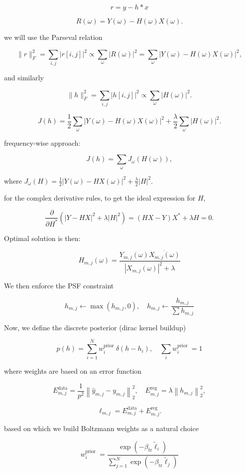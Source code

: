 \documentclass{article}
\theoremstyle{definition}
\begin{document}
$$
r=y-h * x
$$

$$
R(\omega)=Y(\omega)-H(\omega) X(\omega) .
$$

we will use the Parseval relation

$$
\|r\|_F^2=\sum_{i, j}|r[i, j]|^2 \propto \sum_\omega|R(\omega)|^2=\sum_\omega|Y(\omega)-H(\omega) X(\omega)|^2,
$$

and similarly 

$$
\|h\|_F^2=\sum_{i, j}|h[i, j]|^2 \propto \sum_\omega|H(\omega)|^2 .
$$


$$
J(h)=\frac{1}{2} \sum_\omega|Y(\omega)-H(\omega) X(\omega)|^2+\frac{\lambda}{2} \sum_\omega|H(\omega)|^2 .
$$


frequency-wise approach:

$$
J(h)=\sum_\omega J_\omega(H(\omega)),
$$

where $J_\omega(H)=\frac{1}{2}|Y(\omega)-H X(\omega)|^2+\frac{\lambda}{2}|H|^2$.


for the complex derivative rules, to get the ideal expression for $H$,



$$
\frac{\partial}{\partial H^*}\left(|Y-H X|^2+\lambda|H|^2\right)=(H X-Y) X^*+\lambda H=0 .
$$


Optimal solution is then:

$$
H_{m, j}(\omega)=\frac{Y_{m, j}(\omega) \overline{X_{m, j}(\omega)}}{\left|X_{m, j}(\omega)\right|^2+\lambda}
$$

We then enforce the PSF constraint 


$$
h_{m, j} \leftarrow \max \left(h_{m, j}, 0\right), \quad h_{m, j} \leftarrow \frac{h_{m, j}}{\sum h_{m, j}}
$$


Now, we define the discrete posterior (dirac kernel buildup) 


$$
p(h)=\sum_{i=1}^N w_i^{\text {prior }} \delta\left(h-h_i\right), \quad \sum_i w_i^{\text {prior }}=1
$$


where weights are based on an error function 

$$
E_{m, j}^{\mathrm{data}}=\frac{1}{p^2}\left\|\hat{y}_{m, j}-y_{m, j}\right\|_2^2, \quad E_{m, j}^{\mathrm{reg}}=\lambda\left\|h_{m, j}\right\|_2^2,
$$


$$
\ell_{m, j}=E_{m, j}^{\mathrm{data}}+E_{m, j}^{\mathrm{reg}} .
$$


based on which we build Boltzmann weights as a natural choice 

$$
w_i^{\text {prior }}=\frac{\exp \left(-\beta_{\mathrm{tr}} \tilde{\ell}_i\right)}{\sum_{j=1}^N \exp \left(-\beta_{\mathrm{tr}} \tilde{\ell}_j\right)}
$$
\end{document}
